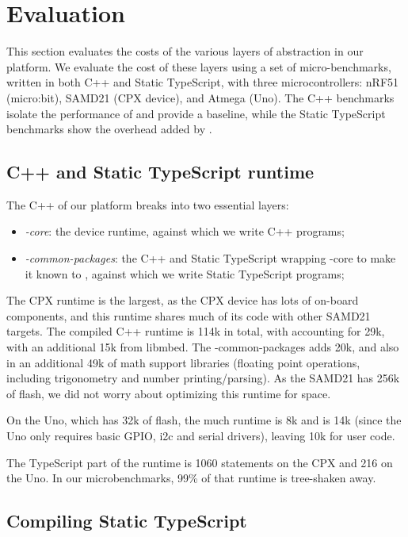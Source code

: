\section{Evaluation}
\label{sec:evaluate}

This section evaluates the costs of the various layers of abstraction in our platform.
We evaluate the cost of these layers using a set of micro-benchmarks, written
in both C++ and Static TypeScript, with three microcontrollers: nRF51 (micro:bit),
SAMD21 (CPX device), and Atmega (Uno). The C++ benchmarks isolate the performance
of \CO and provide a baseline, while the Static TypeScript benchmarks show the overhead
added by \MC.

\subsection{C++ and Static TypeScript runtime}
The C++ of our platform breaks into two essential layers:
\begin{itemize}
\item \emph{\CON-core}: the \CO device runtime, against which we write C++ programs;
\item \emph{\MCN-common-packages}: the C++ and Static TypeScript wrapping \CON-core
to make it known to \MC, against which we write Static TypeScript programs;
\end{itemize}

The CPX runtime is the largest, as the CPX device has lots of on-board
components, and this runtime shares much of its code with other SAMD21 \MC targets.
The compiled C++ runtime is 114k in total, with \CO accounting for 29k, with an
additional 15k from libmbed. The \MCN-common-packages adds 20k, and also in
an additional 49k of math support libraries (floating point operations,
including trigonometry and number printing/parsing).
As the SAMD21 has 256k of flash, we did not worry about optimizing this runtime for space.

On the Uno, which has 32k of flash, the much \MC runtime is 8k and \CO is 14k (since
the Uno only requires basic GPIO, i2c and serial drivers), leaving 10k for user code.

The TypeScript part of the runtime is 1060 statements on the CPX and 216 on the Uno.
In our microbenchmarks, 99\% of that runtime is tree-shaken away.

\subsection{Compiling Static TypeScript}

